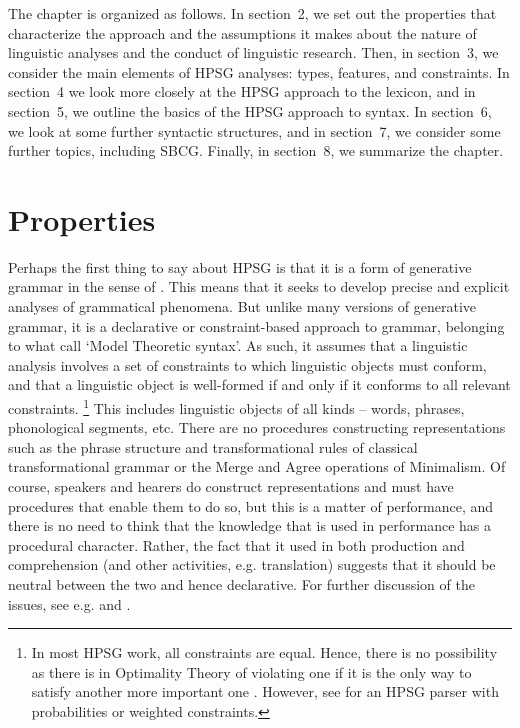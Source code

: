 \documentclass[output=paper
	        ,collection
	        ,collectionchapter
 	        ,biblatex
                ,babelshorthands
                ,newtxmath
                ,draftmode
                ,colorlinks, citecolor=brown
]{langscibook}
\begin{document}
The chapter is organized as follows. In section~2, we set out the properties that characterize the approach and the assumptions it makes about the nature of linguistic analyses and the conduct of linguistic research. Then, in section~3, we consider the main elements of HPSG analyses: types, features, and constraints. In section~4 we look more closely at the HPSG approach to the lexicon, and in section~5, we outline the basics of the HPSG approach to syntax. In section~6, we look at some further syntactic structures, and in section~7, we consider some further topics, including SBCG. Finally, in section~8, we summarize the chapter.


\section{Properties}
Perhaps the first thing to say about HPSG is that it is a form of generative grammar in the sense of \citet{Chomsky57a}. This means that it seeks to develop precise and explicit analyses of grammatical phenomena. But unlike many versions of generative grammar, it is a declarative or constraint-based approach to grammar, belonging to what \citet{PullumScholz2001} call ‘Model Theoretic syntax’. As such, it assumes that a linguistic analysis involves a set of constraints to which linguistic objects must conform, and that a linguistic object is well-formed if and only if it conforms to all relevant constraints.%
%
\footnote{In most HPSG work, all constraints are equal. Hence, there is no possibility as there is in Optimality Theory of violating one if it is the only way to satisfy another more important one \citep{Malouf2003a}. However, see \citealt{MK2000a-cr,OFTM2004a-u} for an HPSG parser with probabilities or weighted constraints.}
%
This includes linguistic objects of all kinds – words, phrases, phonological segments, etc. There are no procedures constructing representations such as the phrase structure and transformational rules of classical transformational grammar or the Merge and Agree operations of Minimalism. Of course, speakers and hearers do construct representations and must have procedures that enable them to do so, but this is a matter of performance, and there is no need to think that the knowledge that is used in performance has a procedural character. Rather, the fact that it used in both production and comprehension (and other activities, e.g. translation) suggests that it should be neutral between the two and hence declarative. For further discussion of the issues, see e.g. \citet{PullumScholz2001,Postal2003a} and \citet{SW2011a,SW2015a}.
\end{document}
